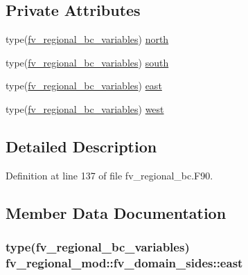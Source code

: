 \subsection*{Private Attributes}
\begin{DoxyCompactItemize}
\item 
type(\hyperlink{structfv__regional__mod_1_1fv__regional__bc__variables}{fv\-\_\-regional\-\_\-bc\-\_\-variables}) \hyperlink{structfv__regional__mod_1_1fv__domain__sides_a6a402489c7a747378659aa9cb5c71ccc}{north}
\item 
type(\hyperlink{structfv__regional__mod_1_1fv__regional__bc__variables}{fv\-\_\-regional\-\_\-bc\-\_\-variables}) \hyperlink{structfv__regional__mod_1_1fv__domain__sides_ac4624a2514b912d5a1c07ecf9ff7d60b}{south}
\item 
type(\hyperlink{structfv__regional__mod_1_1fv__regional__bc__variables}{fv\-\_\-regional\-\_\-bc\-\_\-variables}) \hyperlink{structfv__regional__mod_1_1fv__domain__sides_ad1855a10ca6e6693ddff2d9140fbdd0a}{east}
\item 
type(\hyperlink{structfv__regional__mod_1_1fv__regional__bc__variables}{fv\-\_\-regional\-\_\-bc\-\_\-variables}) \hyperlink{structfv__regional__mod_1_1fv__domain__sides_af38228133162c39631151b32cd934d36}{west}
\end{DoxyCompactItemize}


\subsection{Detailed Description}


Definition at line 137 of file fv\-\_\-regional\-\_\-bc.\-F90.



\subsection{Member Data Documentation}
\subsubsection[{east}]{\setlength{\rightskip}{0pt plus 5cm}type({\bf fv\-\_\-regional\-\_\-bc\-\_\-variables}) fv\-\_\-regional\-\_\-mod\-::fv\-\_\-domain\-\_\-sides\-::east\hspace{0.3cm}{\ttfamily [private]}}\label{structfv__regional__mod_1_1fv__domain__sides_ad1855a10ca6e6693ddff2d9140fbdd0a}


